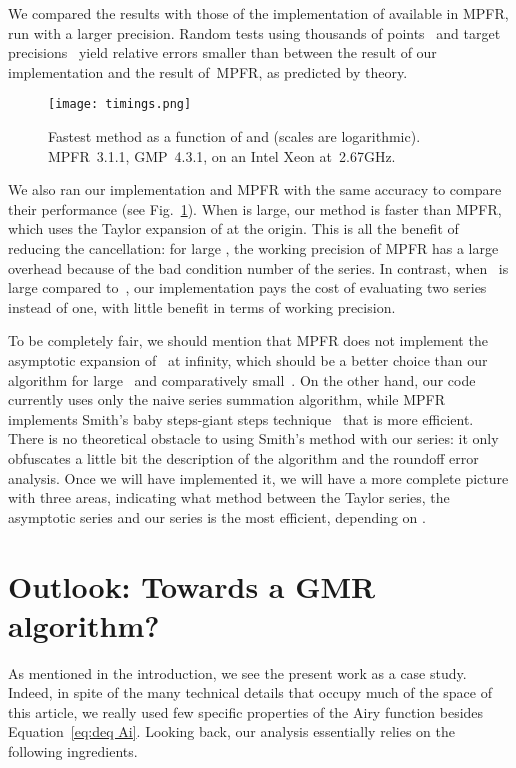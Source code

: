 \documentclass[10pt, conference]{IEEEtran}
\begin{document}
We compared the results with those of the implementation of  available in MPFR, run with a larger precision.
Random tests using thousands of points~ and target precisions~ yield relative errors smaller than  between the result of our implementation and the result of~MPFR, as predicted by theory.

\begin{figure}
  \centerline{\texttt{[image: timings.png]}}
  \caption{Fastest method as a function of  and  (scales are logarithmic). MPFR~3.1.1, GMP~4.3.1, on an Intel Xeon at~2.67GHz.\label{fig:comparison with MPFR}}
\end{figure}

We also ran our implementation and MPFR with the same accuracy to compare their performance (see Fig.~\ref{fig:comparison with MPFR}).
When  is large, our method is faster than MPFR, which uses the Taylor expansion of  at the origin. This is all the benefit of reducing the cancellation: for large , the working precision of MPFR has a large overhead because of the bad condition number of the series.
In contrast, when ~is large compared to~, our implementation pays the cost of evaluating two series instead of one, with little benefit in terms of working precision.

To be completely fair, we should mention that MPFR does not implement the asymptotic expansion of~ at infinity, which should be a better choice than our algorithm for large~ and comparatively small~. On the other hand, our code currently uses only the naive series summation algorithm, while MPFR implements Smith's baby steps-giant steps technique~\cite{PatersonStockmeyer1973,Smith1989} that is more efficient. There is no theoretical obstacle to using Smith's method with our series: it only obfuscates a little bit the description of the algorithm and the roundoff error analysis. Once we will have implemented it, we will have a more complete picture with three areas, indicating what method between the Taylor series, the asymptotic series and our series is the most efficient, depending on .

\section{Outlook: Towards a GMR algorithm?}
\label{sec:conclusion}

As mentioned in the introduction, we see the present work as a case study.
Indeed, in spite of the many technical details that occupy much of the space of this article, we really used few specific properties of the Airy function besides Equation~\eqref{eq:deq Ai}.
Looking back, our analysis essentially relies on the following ingredients.
\end{document}
